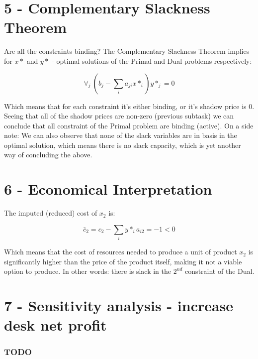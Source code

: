 \documentclass[
  letterpaper,
  DIV=11,
  numbers=noendperiod]{scrartcl}
\begin{document}
\newpage

\section{5 - Complementary Slackness
Theorem}\label{complementary-slackness-theorem}

Are all the constraints binding? \newline The Complementary Slackness
Theorem implies for \(x*\) and \(y*\) - optimal solutions of the Primal
and Dual problems respectively:

\[
\forall_{j}{\ (b_j - \sum_{i}{a_{ji}x*_i})y*_j = 0}
\]

Which means that for each constraint it's either binding, or it's shadow
price is \(0\). Seeing that all of the shadow prices are non-zero
(previous subtask) we can conclude that all constraint of the Primal
problem are binding (active). \newline On a side note: We can also
observe that none of the slack variables are in basis in the optimal
solution, which means there is no slack capacity, which is yet another
way of concluding the above.

\newpage

\section{6 - Economical Interpretation}\label{economical-interpretation}

The imputed (reduced) cost of \(x_2\) is:

\[
\bar{c}_2 = c_2 - \sum_{i}{y*_i a_{i2}} = -1 < 0
\]

Which means that the cost of resources needed to produce a unit of
product \(x_2\) is significantly higher than the price of the product
itself, making it not a viable option to produce. \newline In other
words: there is slack in the \(2^{nd}\) constraint of the Dual.

\newpage

\section{7 - Sensitivity analysis - increase desk net
profit}\label{sensitivity-analysis---increase-desk-net-profit}

\subsubsection{TODO}\label{todo}
\end{document}
